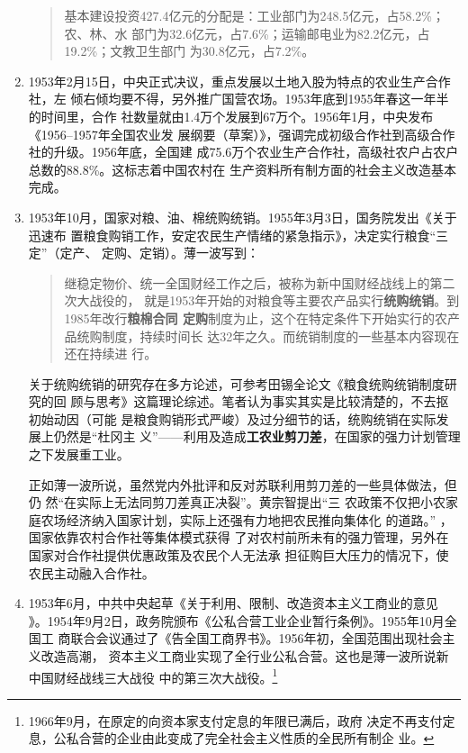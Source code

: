 \begin{enumerate}
\begin{quotation}
    基本建设投资427.4亿元的分配是：工业部门为248.5亿元，占58.2\%；农、林、水
    部门为32.6亿元，占7.6\%；运输邮电业为82.2亿元，占19.2\%；文教卫生部门
    为30.8亿元，占7.2\%。
  \end{quotation}

\item 1953年2月15日，中央正式决议，重点发展以土地入股为特点的农业生产合作社，左
  倾右倾均要不得，另外推广国营农场。1953年底到1955年春这一年半的时间里，合作
  社数量就由1.4万个发展到67万个。1956年1月，中央发布《1956--1957年全国农业发
  展纲要（草案）》，强调完成初级合作社到高级合作社的升级。1956年底，全国建
  成75.6万个农业生产合作社，高级社农户占农户总数的88.8\%。这标志着中国农村在
  生产资料所有制方面的社会主义改造基本完成。

\item 1953年10月，国家对粮、油、棉统购统销。1955年3月3日，国务院发出《关于迅速布
  置粮食购销工作，安定农民生产情绪的紧急指示》，决定实行粮食“三定”（定产、
  定购、定销）。薄一波写到：
  \begin{quotation}
    继稳定物价、统一全国财经工作之后，被称为新中国财经战线上的第二次大战役的，
    就是1953年开始的对粮食等主要农产品实行\textbf{统购统销}。到1985年改行\textbf{粮棉合同
      定购}制度为止，这个在特定条件下开始实行的农产品统购制度，持续时间长
    达32年之久。而统销制度的一些基本内容现在还在持续进
    行。
  \end{quotation}

  关于统购统销的研究存在多方论述，可参考田锡全论文《粮食统购统销制度研究的回
  顾与思考》这篇理论综述。笔者认为事实其实是比较清楚的，不去抠初始动因（可能
  是粮食购销形式严峻）及过分细节的话，统购统销在实际发展上仍然是“杜冈主
  义”——利用及造成\textbf{工农业剪刀差}，在国家的强力计划管理之下发展重工业。

  正如薄一波所说，虽然党内外批评和反对苏联利用剪刀差的一些具体做法，但仍
  然“在实际上无法同剪刀差真正决裂”。黄宗智提出“三
  农政策不仅把小农家庭农场经济纳入国家计划，实际上还强有力地把农民推向集体化
  的道路。” ，国家依靠农村合作社等集体模式获得
  了对农村前所未有的强力管理，另外在国家对合作社提供优惠政策及农民个人无法承
  担征购巨大压力的情况下，使农民主动融入合作社。

\item 1953年6月，中共中央起草《关于利用、限制、改造资本主义工商业的意见
  》。1954年9月2日，政务院颁布《公私合营工业企业暂行条例》。1955年10月全国工
  商联合会议通过了《告全国工商界书》。1956年初，全国范围出现社会主义改造高潮，
  资本主义工商业实现了全行业公私合营。这也是薄一波所说新中国财经战线三大战役
  中的第三次大战役。\footnote{1966年9月，在原定的向资本家支付定息的年限已满后，政府
    决定不再支付定息，公私合营的企业由此变成了完全社会主义性质的全民所有制企
    业。}


\end{enumerate}
